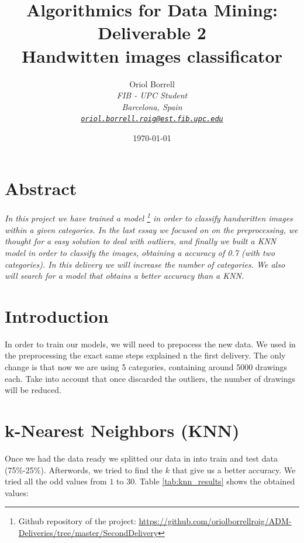 \documentclass{article}
\title{
\textbf{Algorithmics for Data Mining: Deliverable 2\\} \Large{
    Handwitten images classificator}}
\author{Oriol Borrell\\
\textit{\small FIB - UPC Student} \\
\textit{\small Barcelona, Spain} \\
\textit{\texttt{\href{mailto:oriol.borrell.roig@est.fib.upc.edu}
{\small oriol.borrell.roig@est.fib.upc.edu}}}}
\date{\today}
\begin{document}
\maketitle

\section{Abstract}
\textit{
In this project we have trained a model \footnote{Github repository of the project: \url{https://github.com/oriolborrellroig/ADM-Deliveries/tree/master/SecondDelivery}} in order to classify handwritten images within a given categories. In the last essay we focused on on the preprocessing, we thought for a easy solution to deal with outliers, and finally we built a KNN model in order to classify the images, obtaining a accuracy of 0.7 (with two categories). In this delivery we will increase the number of categories. We also will search for a model that obtains a better accuracy than a KNN.
}

\section{Introduction}
\label{Modeling}
In order to train our models, we will need to prepocess the new data. We used in the preprocessing the exact same steps explained n the first delivery. The only change is that now we are using 5 categories, containing around 5000 drawings each. Take into account that once discarded the outliers, the number of drawings will be reduced. 

\section{k-Nearest Neighbors (KNN)} 
\label{KNN}
Once we had the data ready we splitted our data in into train and test data (75\%-25\%). Afterwords, we tried to find the $k$ that give us a better accuracy. We tried all the odd values from $1$ to $30$. Table \ref{tab:knn_results} shows the obtained values:
\end{document}

